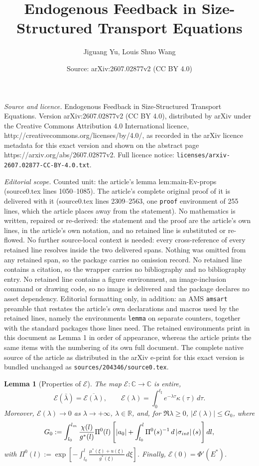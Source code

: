 \documentclass[10pt,a4paper]{amsart}
\title{Endogenous Feedback in Size-Structured Transport Equations}
\author{Jiguang Yu, Louis Shuo Wang}
\date{Source: arXiv:2607.02877v2 (CC BY 4.0)}
\newtheorem{lemma}{Lemma}
\newcommand{\C}{\mathbb{C}}
\newcommand{\Ev}{\mathcal{E}}
\newcommand{\R}{\mathbb{R}}
\newcommand{\abs}[1]{\left\lvert#1\right\rvert}
\begin{document}
\maketitle

\noindent\emph{Source and licence.} Endogenous Feedback in Size-Structured Transport Equations. Version arXiv:2607.02877v2 (CC BY 4.0), distributed by arXiv under the Creative Commons Attribution 4.0 International licence, http://creativecommons.org/licenses/by/4.0/, as recorded in the arXiv licence metadata for this exact version and shown on the abstract page https://arxiv.org/abs/2607.02877v2. Full licence notice: \texttt{licenses/arxiv-2607.02877-CC-BY-4.0.txt}.\par\smallskip

\noindent\textit{Editorial scope.} Counted unit: the article's lemma lem:main-Ev-props (source0.tex lines 1050--1085). The article's complete original proof of it is delivered with it (source0.tex lines 2309--2563, one \texttt{proof} environment of 255 lines, which the article places away from the statement). No mathematics is written, repaired or re-derived: the statement and the proof are the article's own lines, in the article's own notation, and no retained line is substituted or re-flowed.  No further source-local context is needed: every cross-reference of every retained line resolves inside the two delivered spans.  Nothing was omitted from any retained span, so the package carries no omission record.  No retained line contains a citation, so the wrapper carries no bibliography and no bibliography entry.  No retained line contains a figure environment, an image-inclusion command or drawing code, so no image is delivered and the package declares no asset dependency.  Editorial formatting only, in addition: an AMS \texttt{amsart} preamble that restates the article's own declarations and macros used by the retained lines, namely the environments \texttt{lemma} on separate counters, together with the standard packages those lines need.  The retained environments print in this document as Lemma 1 in order of appearance, whereas the article prints the same items with the numbering of its own full document.  The complete native source of the article as distributed in the arXiv e-print for this exact version is bundled unchanged as \texttt{sources/204346/source0.tex}.
\begin{lemma}[Properties of \(\Ev\)]
\label{lem:main-Ev-props}
The map \(\Ev:\C\to\C\) is entire,
\[
\Ev(\bar\lambda)=\overline{\Ev(\lambda)},
\qquad
\Ev(\lambda)=\int_0^{t_\sharp}e^{-\lambda\tau}\kappa(\tau)\,d\tau .
\]
Moreover,
$\Ev(\lambda)\to0$ as $\lambda\to+\infty$, $\lambda\in\R$,
and, for \(\Re\lambda\ge0\),
$\displaystyle 
\abs{\Ev(\lambda)}\le G_0$,
where
\[
G_0:=
\int_{l_0}^{l_m}
\frac{\chi(l)}{g^*(l)}
\Pi^0(l)
\left[
\abs{a_0}
+
\int_{l_0}^{l}
\Pi^0(s)^{-1}\,d\abs{\sigma_{\rm int}}(s)
\right]dl,
\]
with
$\displaystyle 
\Pi^0(l):=
\exp\!\left[
-\int_{l_0}^{l}\frac{\mu^*(\xi)+u(\xi)}{g^*(\xi)}\,d\xi
\right]$.
Finally,
$\displaystyle 
\Ev(0)=\Phi'(E^*)$.
\end{lemma}
\end{document}
